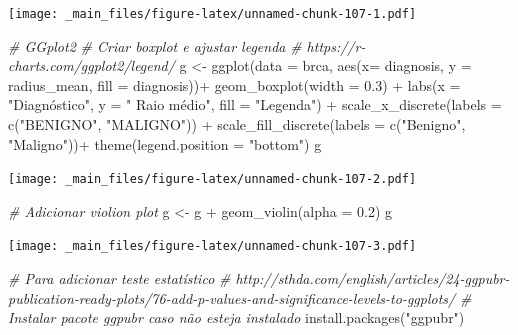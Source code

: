 \documentclass[
]{book}
\newenvironment{Shaded}{\begin{snugshade}}{\end{snugshade}}
\newcommand{\AttributeTok}[1]{\textcolor[rgb]{0.77,0.63,0.00}{#1}}
\newcommand{\CommentTok}[1]{\textcolor[rgb]{0.56,0.35,0.01}{\textit{#1}}}
\newcommand{\FloatTok}[1]{\textcolor[rgb]{0.00,0.00,0.81}{#1}}
\newcommand{\FunctionTok}[1]{\textcolor[rgb]{0.00,0.00,0.00}{#1}}
\newcommand{\NormalTok}[1]{#1}
\newcommand{\OtherTok}[1]{\textcolor[rgb]{0.56,0.35,0.01}{#1}}
\newcommand{\SpecialCharTok}[1]{\textcolor[rgb]{0.00,0.00,0.00}{#1}}
\newcommand{\StringTok}[1]{\textcolor[rgb]{0.31,0.60,0.02}{#1}}
\begin{document}
\texttt{[image: \_main\_files/figure-latex/unnamed-chunk-107-1.pdf]}

\begin{Shaded}
\begin{Highlighting}[]
\CommentTok{\# GGplot2}
\CommentTok{\# Criar boxplot e ajustar legenda}
\CommentTok{\# https://r{-}charts.com/ggplot2/legend/}
\NormalTok{g }\OtherTok{\textless{}{-}} \FunctionTok{ggplot}\NormalTok{(}\AttributeTok{data =}\NormalTok{ brca,}
            \FunctionTok{aes}\NormalTok{(}\AttributeTok{x=}\NormalTok{ diagnosis, }\AttributeTok{y =}\NormalTok{ radius\_mean, }\AttributeTok{fill =}\NormalTok{ diagnosis))}\SpecialCharTok{+}
  \FunctionTok{geom\_boxplot}\NormalTok{(}\AttributeTok{width =} \FloatTok{0.3}\NormalTok{) }\SpecialCharTok{+}
  \FunctionTok{labs}\NormalTok{(}\AttributeTok{x =} \StringTok{"Diagnóstico"}\NormalTok{,}
       \AttributeTok{y =} \StringTok{" Raio médio"}\NormalTok{,}
       \AttributeTok{fill =} \StringTok{"Legenda"}\NormalTok{) }\SpecialCharTok{+}
  \FunctionTok{scale\_x\_discrete}\NormalTok{(}\AttributeTok{labels =} \FunctionTok{c}\NormalTok{(}\StringTok{"BENIGNO"}\NormalTok{, }\StringTok{"MALIGNO"}\NormalTok{)) }\SpecialCharTok{+}
  \FunctionTok{scale\_fill\_discrete}\NormalTok{(}\AttributeTok{labels =} \FunctionTok{c}\NormalTok{(}\StringTok{"Benigno"}\NormalTok{, }\StringTok{"Maligno"}\NormalTok{))}\SpecialCharTok{+}
  \FunctionTok{theme}\NormalTok{(}\AttributeTok{legend.position =} \StringTok{"bottom"}\NormalTok{)}
\NormalTok{g}
\end{Highlighting}
\end{Shaded}

\texttt{[image: \_main\_files/figure-latex/unnamed-chunk-107-2.pdf]}

\begin{Shaded}
\begin{Highlighting}[]
\CommentTok{\# Adicionar violion plot}
\NormalTok{g }\OtherTok{\textless{}{-}}\NormalTok{ g }\SpecialCharTok{+} \FunctionTok{geom\_violin}\NormalTok{(}\AttributeTok{alpha =} \FloatTok{0.2}\NormalTok{)}
\NormalTok{g}
\end{Highlighting}
\end{Shaded}

\texttt{[image: \_main\_files/figure-latex/unnamed-chunk-107-3.pdf]}

\begin{Shaded}
\begin{Highlighting}[]
\CommentTok{\# Para adicionar teste estatístico}
\CommentTok{\# http://sthda.com/english/articles/24{-}ggpubr{-}publication{-}ready{-}plots/76{-}add{-}p{-}values{-}and{-}significance{-}levels{-}to{-}ggplots/}
\CommentTok{\# Instalar pacote ggpubr caso não esteja instalado}
\FunctionTok{install.packages}\NormalTok{(}\StringTok{"ggpubr"}\NormalTok{)}
\end{Highlighting}
\end{Shaded}
\end{document}
